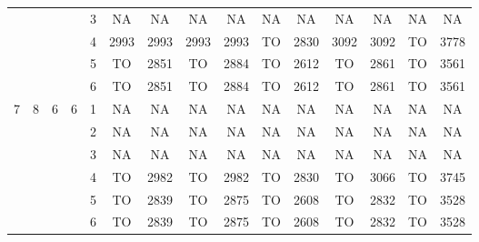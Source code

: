\begin{longtable}{|c|c|c|c|c|c c|c c|c c|c c|c c|}
 & & & & 3 & NA & NA & NA & NA & NA & NA & NA & NA & NA & NA \\
 & & & & 4 & 2993 & 2993 & 2993 & 2993 & TO & 2830 & 3092 & 3092 & TO & 3778 \\
 & & & & 5 & TO & 2851 & TO & 2884 & TO & 2612 & TO & 2861 & TO & 3561 \\
 & & & & 6 & TO & 2851 & TO & 2884 & TO & 2612 & TO & 2861 & TO & 3561 \\
\hline
\multirow{6}{*}{7} & \multirow{6}{*}{8} & \multirow{6}{*}{6} & \multirow{6}{*}{6} & 1 & NA & NA & NA & NA & NA & NA & NA & NA & NA & NA \\
 & & & & 2 & NA & NA & NA & NA & NA & NA & NA & NA & NA & NA \\
 & & & & 3 & NA & NA & NA & NA & NA & NA & NA & NA & NA & NA \\
 & & & & 4 & TO & 2982 & TO & 2982 & TO & 2830 & TO & 3066 & TO & 3745 \\
 & & & & 5 & TO & 2839 & TO & 2875 & TO & 2608 & TO & 2832 & TO & 3528 \\
 & & & & 6 & TO & 2839 & TO & 2875 & TO & 2608 & TO & 2832 & TO & 3528 \\
\hline
\end{longtable}